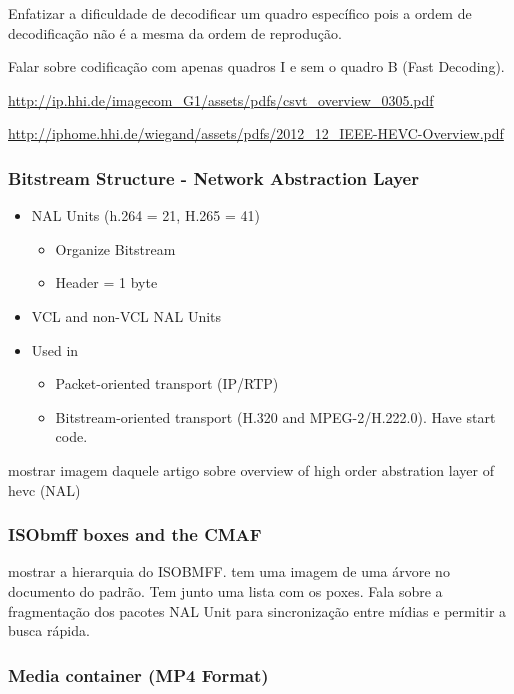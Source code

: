 Enfatizar a dificuldade de decodificar um quadro específico pois a ordem de decodificação não é a mesma da ordem de reprodução.

Falar sobre codificação com apenas quadros I e sem o quadro B (Fast Decoding).

\url{http://ip.hhi.de/imagecom_G1/assets/pdfs/csvt_overview_0305.pdf }

\url{http://iphome.hhi.de/wiegand/assets/pdfs/2012_12_IEEE-HEVC-Overview.pdf}

\subsubsection{Bitstream Structure - Network Abstraction Layer}

\begin{itemize}
    \item NAL Units (h.264 = 21, H.265 = 41)
    \begin{itemize}
        \item Organize Bitstream
        \item Header = 1 byte
    \end{itemize}
    \item VCL and non-VCL NAL Units
    \item Used in
    \begin{itemize}
        \item Packet-oriented transport (IP/RTP)
        \item Bitstream-oriented transport (H.320 and MPEG-2/H.222.0). Have start code.
    \end{itemize}

\end{itemize}

mostrar imagem daquele artigo sobre overview of high order abstration layer of hevc (NAL)


\subsubsection{ISObmff boxes and the CMAF}

mostrar a hierarquia do ISOBMFF. tem uma imagem de uma árvore no documento do padrão. Tem junto uma lista com os poxes. Fala sobre a fragmentação dos pacotes NAL Unit para sincronização entre mídias e permitir a busca rápida.

\subsubsection{Media container (MP4 Format)}

